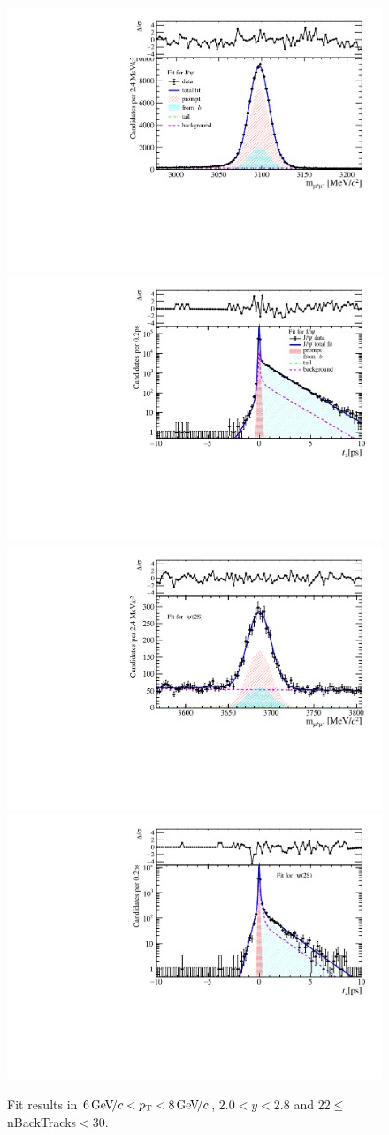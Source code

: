 \begin{figure}[H]
\begin{center}
\includegraphics[width=0.47\linewidth]{pdf/Jpsi/drawmassB/n4y1pt4.pdf}
\includegraphics[width=0.47\linewidth]{pdf/Jpsi/2DFitB/n4y1pt4.pdf}
\vspace*{-0.5cm}
\includegraphics[width=0.47\linewidth]{pdf/Psi2S/drawmassB/n4y1pt4.pdf}
\includegraphics[width=0.47\linewidth]{pdf/Psi2S/2DFitB/n4y1pt4.pdf}
\vspace*{-0.5cm}
\end{center}
\caption{Fit results in $6\text{\,Ge\kern -0.1em V\!/}c<p_{\mathrm{T}}<8\text{\,Ge\kern -0.1em V\!/}c$, $2.0<y<2.8$ and 22$\leq$nBackTracks$<$30.}
\label{Fitn4y1pt4}
\end{figure}
